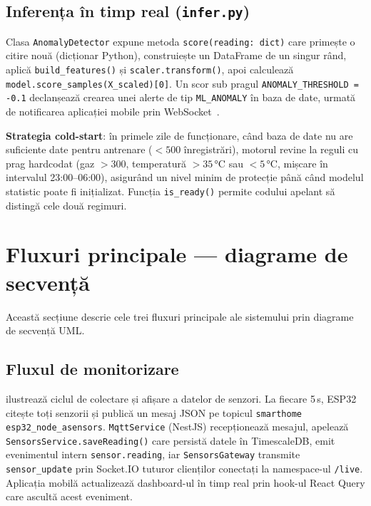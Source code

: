 \subsection{Inferența în timp real (\texttt{infer.py})}
\label{sec:infer}

Clasa \texttt{AnomalyDetector} expune metoda \texttt{score(reading: dict)}
care primește o citire nouă (dicționar Python), construiește un DataFrame
de un singur rând, aplică \texttt{build\_features()} și
\texttt{scaler.transform()}, apoi calculează
\texttt{model.\allowbreak score\_samples(\allowbreak X\_scaled)[0]}.
Un scor sub pragul \texttt{ANOMALY\_THRESHOLD = -0.1} declanșează
crearea unei alerte de tip \texttt{ML\_ANOMALY} în baza de date,
urmată de notificarea aplicației mobile prin WebSocket~\cite{chandola2009anomaly}.

\textbf{Strategia cold-start}: în primele zile de funcționare, când
baza de date nu are suficiente date pentru antrenare ($< 500$ înregistrări),
motorul revine la reguli cu prag hardcodat (gaz $> 300$,
temperatură $> 35$\,°C sau $< 5$\,°C, mișcare în intervalul 23:00–06:00),
asigurând un nivel minim de protecție până când modelul statistic poate
fi inițializat.
Funcția \texttt{is\_ready()} permite codului apelant să distingă cele
două regimuri.

\section{Fluxuri principale — diagrame de secvență}
\label{sec:secvente}

Această secțiune descrie cele trei fluxuri principale ale sistemului
prin diagrame de secvență UML.

\subsection{Fluxul de monitorizare}
\label{sec:secv-monitor}

 ilustrează ciclul de colectare și afișare a
datelor de senzori.
La fiecare 5\,s, ESP32 citește toți senzorii și publică un mesaj JSON pe
topicul \texttt{smarthome\slb{} esp32\_node\_a\slb{}sensors}.
\texttt{MqttService} (NestJS) recepționează mesajul, apelează
\texttt{SensorsService.saveReading()} care persistă datele în
TimescaleDB, emit evenimentul intern \texttt{sensor.reading}, iar
\texttt{SensorsGateway} transmite \texttt{sensor\_update} prin
Socket.IO tuturor clienților conectați la namespace-ul \texttt{/live}.
Aplicația mobilă actualizează dashboard-ul în timp real prin
hook-ul React Query care ascultă acest eveniment.

